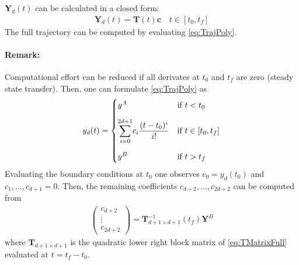 \documentclass[a4paper,12pt,headinclude=true,headsepline,parskip=half,DIV=12]{scrartcl}
\begin{document}
$\mathbf{Y}_d(t)$ can be calculated in a closed form:
\begin{align}
  \label{eq:3}
  \mathbf{Y}_d(t)=\mathbf{T}(t)\mathbf{c} \quad t \in [t_0,t_f]
\end{align}
The full trajectory can be computed by evaluating \autoref{eq:TrajPoly}.

\paragraph{Remark:} Computational effort can be reduced if all derivates at $t_0$ and $t_f$ are zero (steady state transfer). Then, one can formulate \autoref{eq:TrajPoly} as
\begin{equation}
  y_d(t)=
  \begin{cases}
    y^A                                                      & \textrm{if } t < t_0         \\[2ex]
    \mathlarger{\sum_{i=0}^{2d+1}}c_i\dfrac{(t - t_0)^i}{i!} & \textrm{if } t \in [t_0,t_f] \\[4ex]
    y^B                                                      & \textrm{if } t > t_f
  \end{cases} \label{eq:TrajPolyAlt}
\end{equation}
Evaluating the boundary conditions at $t_0$ one observes $c_0 = y_d(t_0)$ and $c_1, \ldots, c_{d+1} = 0$. Then, the remaining coefficients $c_{d+2}, \ldots, c_{2d+2}$ can be computed from
\begin{align}
  \label{eq:PolyCoeffAlt}
  \begin{pmatrix}
    c_{d+2} \\ \vdots \\ c_{2d+2}
  \end{pmatrix}
  = \mathbf{T}_{d+1 \times d+1}^{-1}(t_f) \mathbf{Y}^B
\end{align}
where $\mathbf{T}_{d+1 \times d+1}$ is the quadratic lower right block matrix of \autoref{eq:TMatrixFull} evaluated at $t = t_f - t_0$.
\end{document}
